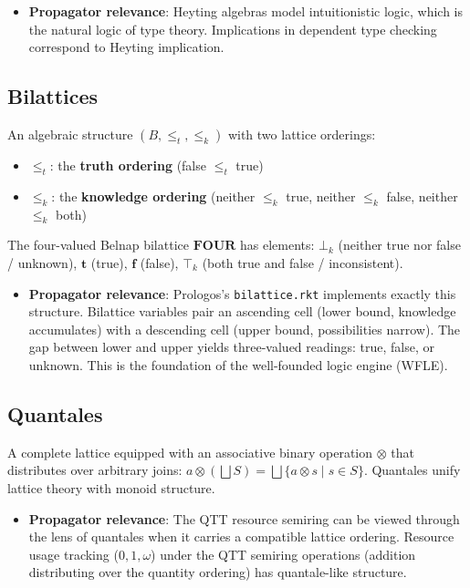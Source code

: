 \documentclass[11pt]{article}
\begin{document}
\begin{itemize}
\item \textbf{Propagator relevance}: Heyting algebras model intuitionistic logic, which is
the natural logic of type theory. Implications in dependent type checking
correspond to Heyting implication.
\end{itemize}
\subsection{Bilattices}
\label{sec:org9dc629b}

An algebraic structure \((B, \leq_t, \leq_k)\) with two lattice orderings:

\begin{itemize}
\item \(\leq_t\): the \textbf{truth ordering} (false \(\leq_t\) true)
\item \(\leq_k\): the \textbf{knowledge ordering} (neither \(\leq_k\) true, neither \(\leq_k\)
false, neither \(\leq_k\) both)
\end{itemize}

The four-valued Belnap bilattice \(\mathbf{FOUR}\) has elements: \(\bot_k\) (neither
true nor false / unknown), \(\mathbf{t}\) (true), \(\mathbf{f}\) (false), \(\top_k\)
(both true and false / inconsistent).

\begin{itemize}
\item \textbf{Propagator relevance}: Prologos's \texttt{bilattice.rkt} implements exactly this
structure. Bilattice variables pair an ascending cell (lower bound, knowledge
accumulates) with a descending cell (upper bound, possibilities narrow). The gap
between lower and upper yields three-valued readings: true, false, or unknown.
This is the foundation of the well-founded logic engine (WFLE).
\end{itemize}
\subsection{Quantales}
\label{sec:org30b301d}

A complete lattice equipped with an associative binary operation \(\otimes\) that
distributes over arbitrary joins: \(a \otimes (\bigsqcup S) = \bigsqcup \{a
\otimes s \mid s \in S\}\). Quantales unify lattice theory with monoid structure.

\begin{itemize}
\item \textbf{Propagator relevance}: The QTT resource semiring can be viewed through the
lens of quantales when it carries a compatible lattice ordering. Resource
usage tracking (\(0, 1, \omega\)) under the QTT semiring operations (addition
distributing over the quantity ordering) has quantale-like structure.
\end{itemize}
\end{document}

